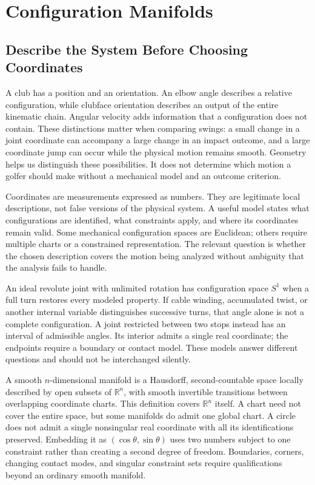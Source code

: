 \documentclass[12pt, openany]{book}
\theoremstyle{plain}
\begin{document}
\chapter{Configuration Manifolds}
\label{ch:configuration_manifolds}

\section{Describe the System Before Choosing Coordinates}

A club has a position and an orientation. An elbow angle describes a relative
configuration, while clubface orientation describes an output of the entire
kinematic chain. Angular velocity adds information that a configuration does
not contain. These distinctions matter when comparing swings: a small change
in a joint coordinate can accompany a large change in an impact outcome, and
a large coordinate jump can occur while the physical motion remains smooth.
Geometry helps us distinguish these possibilities. It does not determine which
motion a golfer should make without a mechanical model and an outcome criterion.

Coordinates are measurements expressed as numbers. They are legitimate local
descriptions, not false versions of the physical system. A useful model states
what configurations are identified, what constraints apply, and where its
coordinates remain valid. Some mechanical configuration spaces are Euclidean;
others require multiple charts or a constrained representation. The relevant
question is whether the chosen description covers the motion being analyzed
without ambiguity that the analysis fails to handle.

An ideal revolute joint with unlimited rotation has configuration space $S^1$
when a full turn restores every modeled property. If cable winding, accumulated
twist, or another internal variable distinguishes successive turns, that angle
alone is not a complete configuration. A joint restricted between two stops
instead has an interval of admissible angles. Its interior admits a single
real coordinate; the endpoints require a boundary or contact model. These
models answer different questions and should not be interchanged silently.

A smooth $n$-dimensional manifold is a Hausdorff, second-countable space locally
described by open subsets of $\mathbb R^n$, with smooth invertible transitions
between overlapping coordinate charts. This definition covers $\mathbb R^n$
itself. A chart need not cover the entire space, but some manifolds do admit one
global chart. A circle does not admit a single nonsingular real coordinate
with all its identifications preserved. Embedding it as $(\cos\theta,\sin\theta)$
uses two numbers subject to one constraint rather than creating a second
degree of freedom. Boundaries, corners, changing contact modes, and singular
constraint sets require qualifications beyond an ordinary smooth manifold.
\end{document}
